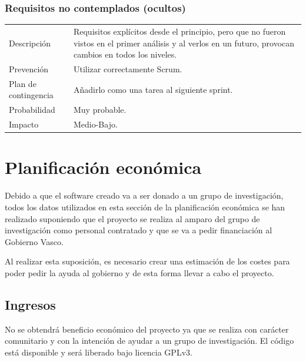 \subsubsection{Requisitos no contemplados (ocultos)}
\begin{table}[H]
    \begin{center}
        \begin{tabular}{l p{8cm}}
            Descripci\'{o}n                 & Requisitos explícitos desde el principio, pero que no fueron
            vistos en el primer an\'{a}lisis y al verlos en un futuro, provocan cambios en todos los niveles. \\
            Prevenci\'{o}n                  & Utilizar correctamente Scrum. \\ 
            Plan de contingencia            & A\~{n}adirlo como una tarea al siguiente sprint. \\
            Probabilidad                    & Muy probable. \\
            Impacto                         & Medio-Bajo. \\
        \end{tabular}
    \end{center}
    
\end{table}

\section{Planificaci\'{o}n econ\'{o}mica}
Debido a que el software creado va a ser donado a un grupo de investigaci\'on, todos los datos
utilizados en esta secci\'on de la planificaci\'on econ\'omica se han realizado suponiendo
que el proyecto se realiza al amparo del grupo de investigaci\'on como personal contratado y que se va a pedir
financiaci\'on al Gobierno Vasco.

Al realizar esta suposici\'on, es necesario crear una estimaci\'on de los costes para poder
pedir la ayuda al gobierno y de esta forma llevar a cabo el proyecto.

\subsection{Ingresos}
No se obtendr\'{a} beneficio econ\'{o}mico del proyecto ya que se realiza con car\'acter comunitario y con la intenci\'on
de ayudar a un grupo de investigaci\'on. El c\'odigo est\'a disponible y ser\'a liberado bajo licencia GPLv3.

